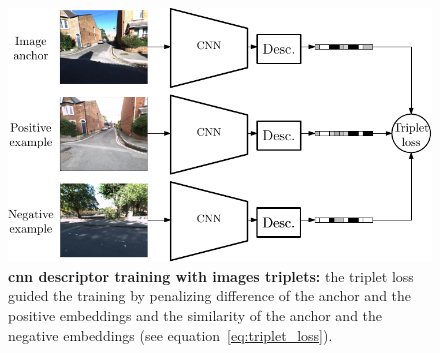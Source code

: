 \begin{figure}
	\centering
	
	\begin{minipage}{0.6\linewidth}		
		\includegraphics[width=\linewidth]{related_work/triplet_training}
	\end{minipage}\hfill
	\begin{minipage}{0.4\linewidth}			
		\caption[Triplet training]{\label{fig:triplet_training} \textbf{\ac{cnn} descriptor training with images triplets:} the triplet loss guided the training by penalizing difference of the anchor and the positive embeddings and the similarity of the anchor and the negative embeddings (see equation~\ref{eq:triplet_loss}).}
	\end{minipage}
	
\end{figure}